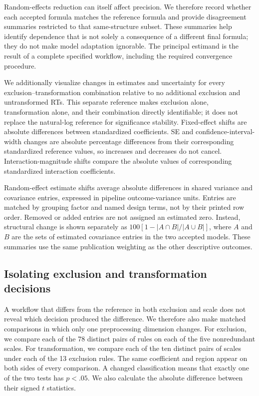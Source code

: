 Random-effects reduction can itself affect precision. We therefore record
whether each accepted formula matches the reference formula and provide
disagreement summaries restricted to that same-structure subset. These
summaries help identify dependence that is not solely a consequence of a
different final formula; they do not make model adaptation ignorable.
The principal estimand is the result of a complete specified workflow,
including the required convergence procedure.

We additionally visualize changes in estimates and uncertainty for every
exclusion--transformation combination relative to no additional exclusion
and untransformed RTs. This separate reference makes exclusion alone,
transformation alone, and their combination directly identifiable; it does
not replace the natural-log reference for significance stability.
Fixed-effect shifts are absolute differences between standardized coefficients.
SE and confidence-interval-width changes are absolute percentage differences
from their corresponding standardized reference values, so increases and
decreases do not cancel. Interaction-magnitude shifts compare the absolute
values of corresponding standardized interaction coefficients.

Random-effect estimate shifts average absolute differences in shared
variance and covariance entries, expressed in pipeline outcome-variance
units. Entries are matched by grouping factor and named design terms, not
by their printed row order. Removed or added entries are not assigned an
estimated zero. Instead, structural change is shown separately as
\(100[1-|A\cap B|/|A\cup B|]\), where \(A\) and \(B\) are the sets of
estimated covariance entries in the two accepted models. These summaries
use the same publication weighting as the other descriptive outcomes.

\subsection{Isolating exclusion and transformation decisions}

A workflow that differs from the reference in both exclusion and scale
does not reveal which decision produced the difference. We therefore
also make matched comparisons in which only one preprocessing dimension
changes. For exclusion, we compare each of the 78 distinct pairs of rules
on each of the five nonredundant scales. For transformation, we compare
each of the ten distinct pairs of scales under each of the 13 exclusion
rules. The same coefficient and region appear on both sides of every
comparison. A changed classification means that exactly one of the two
tests has \(p<.05\). We also calculate the absolute difference between
their signed \(t\) statistics.

